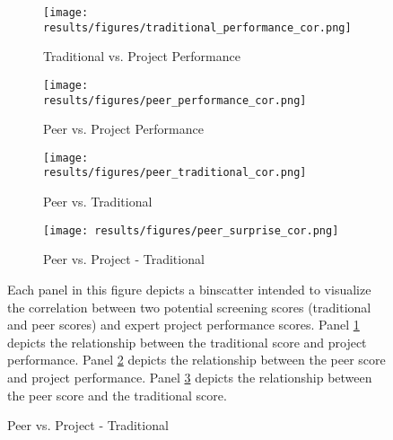     \newpage
    \begin{figure}[!htb]
        \centering
        \caption{Peer Scores and "Surprisingly" Talented Applicants}\label{fig:peer_ditr}
        \begin{subfigure}[t]{.45\textwidth}
            \centering
                    \caption{Traditional vs. Project Performance} \label{subfig:trad_perf}
            \texttt{[image: results/figures/traditional\_performance\_cor.png]} 
        \end{subfigure}
        \hfill
        \vspace{1em}
        \begin{subfigure}[t]{.45\textwidth}
            \centering
                    \caption{Peer vs. Project Performance} \label{subfig:peer_perf}
            \texttt{[image: results/figures/peer\_performance\_cor.png]} 
        \end{subfigure}
        \hfill
        \vspace{1em}
        \begin{subfigure}[t]{.45\textwidth}
            \centering
                   \caption{Peer vs. Traditional} \label{subfig:peer_trad}
            \texttt{[image: results/figures/peer\_traditional\_cor.png]} 
        \end{subfigure}
            \hfill
        \vspace{1em}
         \begin{subfigure}[t]{.45\textwidth}
            \centering
                   \caption{Peer vs. Project - Traditional} \label{subfig:peer_surp}
            \texttt{[image: results/figures/peer\_surprise\_cor.png]} 
        \end{subfigure}
                \hfill
        \vspace{1em}
        \begin{notes}
        Each panel in this figure depicts a binscatter intended to visualize the correlation between two potential screening scores (traditional and peer scores) and expert project performance scores. Panel \ref{subfig:trad_perf} depicts the relationship between the traditional score and project performance. Panel \ref{subfig:peer_perf} depicts the relationship between the peer score and project performance. Panel \ref{subfig:peer_trad} depicts the relationship between the peer score and the traditional score. 
        \end{notes}
    \end{figure}
    
